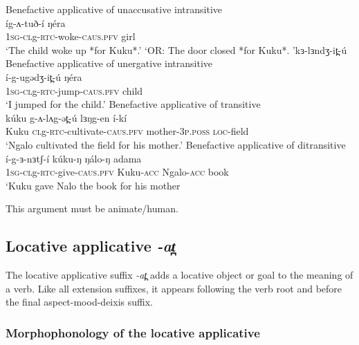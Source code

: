 \ea Benefactive applicative of unaccusative intransitive\\
	\gll   íg-ʌ-tuð-í ŋéra \\
		\textsc{1sg-cl}g-\textsc{rtc}-woke-\textsc{caus.pfv} girl\\
	\glt 	 `The child woke up *for Kuku*.' %
	\glt 	 `OR: The door closed *for Kuku*. 'kɜ-lɜndʒ-it̪-ú %
\ex  Benefactive applicative of unergative intransitive\\
 	\gll í-g-ugədʒ-it̪-ú  ŋéra \\  %
 		\textsc{1sg-cl}g-\textsc{rtc}-jump-\textsc{caus.pfv} child\\
	\glt  `I jumped for the child.'
\ex  Benefactive applicative of transitive\\
 	\gll kúku g-ʌ-lʌg-ət̪-ú lɜŋg-en í-kí			 \\
 	Kuku \textsc{cl}g-\textsc{rtc}-cultivate-\textsc{caus.pfv} mother-\textsc{3p.poss} \textsc{loc}-field \\
 	\glt  `Ngalo cultivated the field for his mother.'   %
\ex  Benefactive applicative of ditransitive\\
 	\gll í-g-ɜ-nɜtʃ-í kúku-ŋ ŋálo-ŋ adama			 \\
 	\textsc{1sg-cl}g-\textsc{rtc}-give-\textsc{caus.pfv} Kuku-\textsc{acc} Ngalo-\textsc{acc} book \\
 	\glt  `Kuku gave Nalo the book for his mother   %
 \z 

This argument must be animate/human. %

%
%		
%

\subsection{Locative applicative \textit{-at̪}}\label{sec:ch11:locappl}

The locative applicative suffix \textit{-at̪} adds a locative object or goal to the meaning of a verb. Like all extension suffixes, it appears following the verb root and before the final aspect-mood-deixis suffix.

\subsubsection{Morphophonology of the locative applicative}\label{sec:ch11:locapplform}

